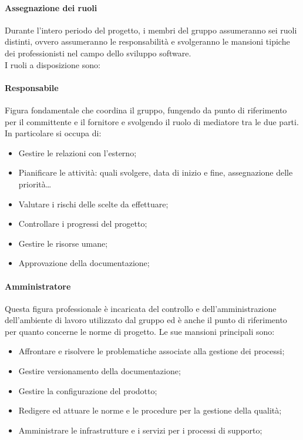 \paragraph{Assegnazione dei ruoli}

Durante l'intero periodo del progetto, i membri del gruppo assumeranno sei ruoli distinti, ovvero assumeranno le responsabilità e svolgeranno le mansioni tipiche dei professionisti nel campo dello sviluppo software.
\\I ruoli a disposizione sono:
\paragraph{Responsabile}\label{responsabile} Figura fondamentale che coordina il gruppo, fungendo da punto di riferimento per il committente e il fornitore e svolgendo il ruolo di mediatore tra le due parti.\\
In particolare si occupa di:
\begin{itemize}
    \item Gestire le relazioni con l'esterno;
    \item Pianificare le attività: quali svolgere, data di inizio e fine, assegnazione delle priorità\dots
    \item Valutare i rischi delle scelte da effettuare;
    \item Controllare i progressi del progetto;
    \item Gestire le risorse umane;
    \item Approvazione della documentazione;
\end{itemize}
\paragraph{Amministratore}\label{amministratore}Questa figura professionale è incaricata del controllo e dell'amministrazione dell'ambiente di lavoro utilizzato dal gruppo ed è anche il punto di riferimento per quanto concerne le norme di progetto. Le sue mansioni principali sono:
\begin{itemize}
    \item Affrontare e risolvere le problematiche associate alla gestione dei processi;
    \item Gestire versionamento della documentazione;
    \item Gestire la configurazione del prodotto;
    \item Redigere ed attuare le norme e le procedure per la gestione della qualità;
    \item Amministrare le infrastrutture e i servizi per i processi di supporto;
\end{itemize}
